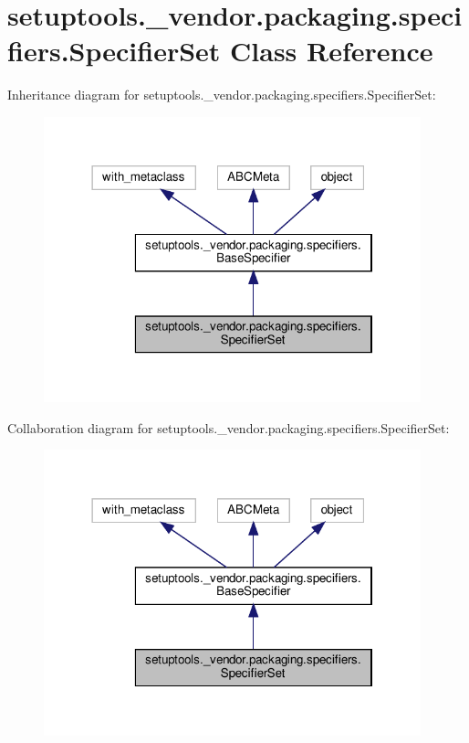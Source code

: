 \hypertarget{classsetuptools_1_1__vendor_1_1packaging_1_1specifiers_1_1SpecifierSet}{}\section{setuptools.\+\_\+vendor.\+packaging.\+specifiers.\+Specifier\+Set Class Reference}
\label{classsetuptools_1_1__vendor_1_1packaging_1_1specifiers_1_1SpecifierSet}


Inheritance diagram for setuptools.\+\_\+vendor.\+packaging.\+specifiers.\+Specifier\+Set\+:
\nopagebreak
\begin{figure}[H]
\begin{center}
\leavevmode
\includegraphics[width=310pt]{classsetuptools_1_1__vendor_1_1packaging_1_1specifiers_1_1SpecifierSet__inherit__graph}
\end{center}
\end{figure}


Collaboration diagram for setuptools.\+\_\+vendor.\+packaging.\+specifiers.\+Specifier\+Set\+:
\nopagebreak
\begin{figure}[H]
\begin{center}
\leavevmode
\includegraphics[width=310pt]{classsetuptools_1_1__vendor_1_1packaging_1_1specifiers_1_1SpecifierSet__coll__graph}
\end{center}
\end{figure}
